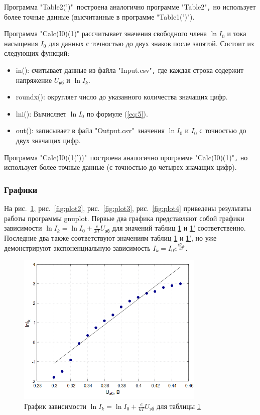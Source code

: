Программа "Table2(')"\ построена аналогично программе "Table2"\verb|,| но использует более точные данные (высчитанные в программе "Table1(')").

Программа "Calc(I0)(1)" рассчитывает значения свободного члена $\ln I_0$ и тока насыщения $I_0$ для данных с точностью до двух знаков после запятой. Состоит из следующих функций:
\begin{itemize}
\item in(): считывает данные из файла "Input.csv"\verb|,| где каждая строка содержит напряжение $U_{\text{кб}}$ и $\ln I_k$.
\item roundx(): округляет число до указанного количества значащих цифр.
\item lni(): Вычисляет $\ln I_0$ по формуле 
 (\ref{eq:5}).
\item out(): записывает в файл "Output.csv"\ значения $\ln I_0$ и $I_0$ с точностью до двух значащих цифр.
\end{itemize}

Программа "Calc(I0)(1('))"\ построена аналогично программе "Calc(I0)(1)"\verb|,| но использует более точные данные (с точностью до четырех значащих цифр).

\subsubsection{Графики}

На рис.~\ref{fig:plot1}, рис.~\ref{fig:plot2}, рис.~\ref{fig:plot3}, рис.~\ref{fig:plot4} приведены результаты работы программы gnuplot. Первые два графика представляют собой графики зависимости $\ln I_k = \ln I_0 + \frac{e}{kT}U_{\text{эб}}$ для значений таблиц \hyperref[tabl:2]{1} и \hyperref[tabl:2]{1'} соответственно. Последние два также соответствуют значениям таблиц \hyperref[tabl:2]{1} и \hyperref[tabl:2]{1'}, но уже демонстрируют экспоненциальную зависимость $I_k = I_0e^{\frac{eU_{\text{эб}}}{kT}}$.

\begin{figure}[H]
\centering
\includegraphics[width=0.8\textwidth]{Plot1.png}
\caption{График зависимости $\ln I_k = \ln I_0 + \frac{e}{kT}U_{\text{эб}}$ для таблицы \hyperref[tabl:1]{1}}
\label{fig:plot1}
\end{figure}

